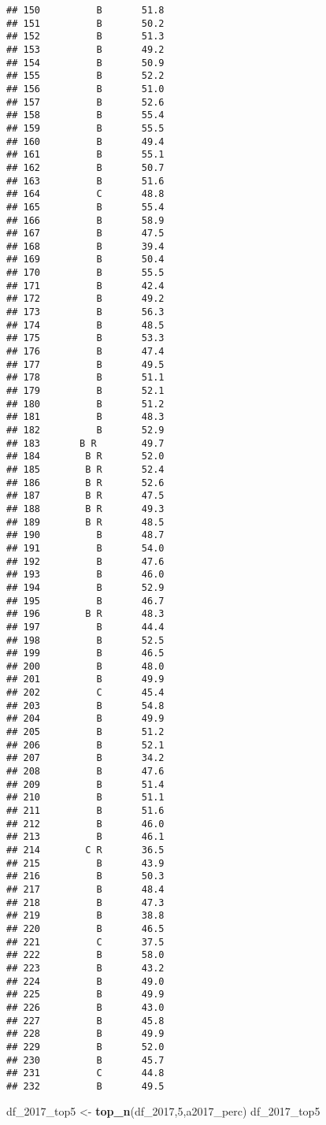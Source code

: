 \documentclass[]{article}
\newenvironment{Shaded}{\begin{snugshade}}{\end{snugshade}}
\newcommand{\DecValTok}[1]{\textcolor[rgb]{0.00,0.00,0.81}{#1}}
\newcommand{\KeywordTok}[1]{\textcolor[rgb]{0.13,0.29,0.53}{\textbf{#1}}}
\newcommand{\NormalTok}[1]{#1}
\newcommand{\StringTok}[1]{\textcolor[rgb]{0.31,0.60,0.02}{#1}}
\begin{document}
\begin{verbatim}
## 150          B       51.8
## 151          B       50.2
## 152          B       51.3
## 153          B       49.2
## 154          B       50.9
## 155          B       52.2
## 156          B       51.0
## 157          B       52.6
## 158          B       55.4
## 159          B       55.5
## 160          B       49.4
## 161          B       55.1
## 162          B       50.7
## 163          B       51.6
## 164          C       48.8
## 165          B       55.4
## 166          B       58.9
## 167          B       47.5
## 168          B       39.4
## 169          B       50.4
## 170          B       55.5
## 171          B       42.4
## 172          B       49.2
## 173          B       56.3
## 174          B       48.5
## 175          B       53.3
## 176          B       47.4
## 177          B       49.5
## 178          B       51.1
## 179          B       52.1
## 180          B       51.2
## 181          B       48.3
## 182          B       52.9
## 183       B R        49.7
## 184        B R       52.0
## 185        B R       52.4
## 186        B R       52.6
## 187        B R       47.5
## 188        B R       49.3
## 189        B R       48.5
## 190          B       48.7
## 191          B       54.0
## 192          B       47.6
## 193          B       46.0
## 194          B       52.9
## 195          B       46.7
## 196        B R       48.3
## 197          B       44.4
## 198          B       52.5
## 199          B       46.5
## 200          B       48.0
## 201          B       49.9
## 202          C       45.4
## 203          B       54.8
## 204          B       49.9
## 205          B       51.2
## 206          B       52.1
## 207          B       34.2
## 208          B       47.6
## 209          B       51.4
## 210          B       51.1
## 211          B       51.6
## 212          B       46.0
## 213          B       46.1
## 214        C R       36.5
## 215          B       43.9
## 216          B       50.3
## 217          B       48.4
## 218          B       47.3
## 219          B       38.8
## 220          B       46.5
## 221          C       37.5
## 222          B       58.0
## 223          B       43.2
## 224          B       49.0
## 225          B       49.9
## 226          B       43.0
## 227          B       45.8
## 228          B       49.9
## 229          B       52.0
## 230          B       45.7
## 231          C       44.8
## 232          B       49.5
\end{verbatim}

\begin{Shaded}
\begin{Highlighting}[]
\NormalTok{df_}\DecValTok{2017}\NormalTok{_top5 <-}\StringTok{ }\KeywordTok{top_n}\NormalTok{(df_}\DecValTok{2017}\NormalTok{,}\DecValTok{5}\NormalTok{,a2017_perc)}
\NormalTok{df_}\DecValTok{2017}\NormalTok{_top5}
\end{Highlighting}
\end{Shaded}
\end{document}
